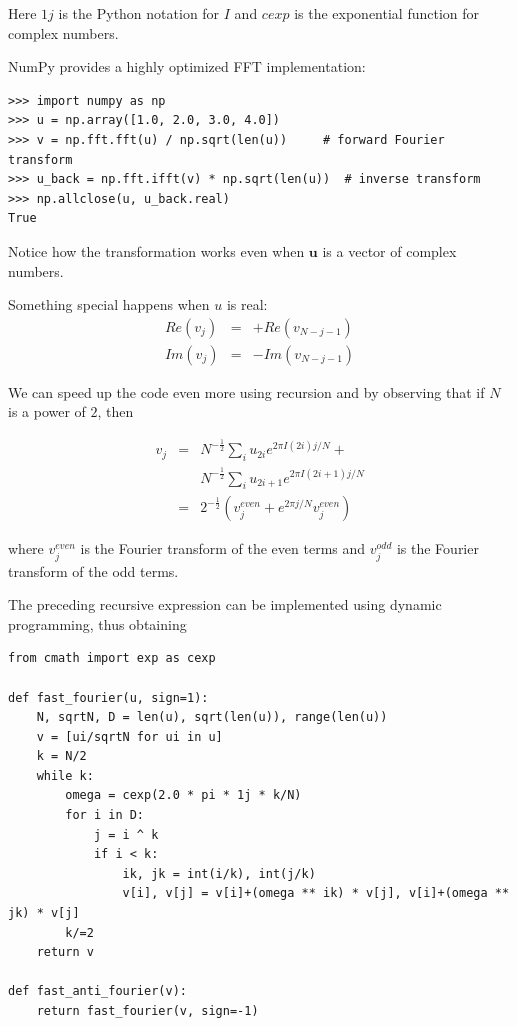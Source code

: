 \documentclass[justified, sixbynine]{tufte-book}
\theoremstyle{plain}%
\newtheorem * {corollary}{Corollary}
\theoremstyle{definition}
\theoremstyle{remark}
\newtheorem * {remark}{Remark}
\newtheorem * {note}{Note}
\begin{document}
\begin{fullwidth}
Here $1j$ is the Python notation for $I$ and $cexp$ is the exponential function for complex numbers.

NumPy provides a highly optimized FFT implementation:

\begin{lstlisting}
>>> import numpy as np
>>> u = np.array([1.0, 2.0, 3.0, 4.0])
>>> v = np.fft.fft(u) / np.sqrt(len(u))     # forward Fourier transform
>>> u_back = np.fft.ifft(v) * np.sqrt(len(u))  # inverse transform
>>> np.allclose(u, u_back.real)
True
\end{lstlisting}

Notice how the transformation works even when $\mathbf{u}$ is a vector of complex numbers.

Something special happens when $u$ is real:
\begin{eqnarray}
Re(v_j) &=& +Re(v_{N-j-1}) \\
Im(v_j) &=& -Im(v_{N-j-1})
\end{eqnarray}

We can speed up the code even more using recursion and by observing that if $N$ is a power of $2$, then

\begin{eqnarray}
v_j &=& N^{-\frac12} \sum_i u_{2i} e^{2\pi I (2i)j/N} + \\
             &&  N^{-\frac12} \sum_i u_{2i+1} e^{2\pi I (2i+1)j/N} \\
             &=& 2^{-\frac12} ( v_j^{even} + e^{2\pi j/N} v_j^{even} )
\end{eqnarray}

where $v_j^{even}$ is the Fourier transform of the even terms and $v_j^{odd}$ is the Fourier transform of the odd terms.

The preceding recursive expression can be implemented using dynamic programming, thus obtaining


\begin{lstlisting}
from cmath import exp as cexp

def fast_fourier(u, sign=1):
    N, sqrtN, D = len(u), sqrt(len(u)), range(len(u))
    v = [ui/sqrtN for ui in u]
    k = N/2
    while k:
        omega = cexp(2.0 * pi * 1j * k/N)
        for i in D:
            j = i ^ k
            if i < k:
                ik, jk = int(i/k), int(j/k)
                v[i], v[j] = v[i]+(omega ** ik) * v[j], v[i]+(omega ** jk) * v[j]
        k/=2
    return v

def fast_anti_fourier(v):
    return fast_fourier(v, sign=-1)
\end{lstlisting}


\end{fullwidth}
\end{document}
